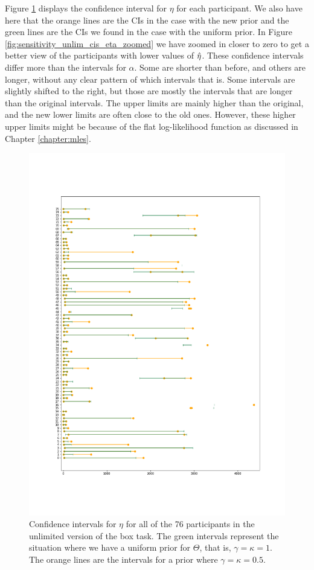 Figure \ref{fig:sensitivity_unlim_cis_eta} displays the confidence interval for $\eta$ for each participant. We also have here that the orange lines are the CIs in the case with the new prior and the green lines are the CIs we found in the case with the uniform prior. In Figure \ref{fig:sensitivity_unlim_cis_eta_zoomed} we have zoomed in closer to zero to get a better view of the participants with lower values of $\hat{\eta}$. These confidence intervals differ more than the intervals for $\alpha$. 
Some are shorter than before, and others are longer, without any clear pattern of which intervals that is. Some intervals are slightly shifted to the right, but those are mostly the intervals that are longer than the original intervals. The upper limits are mainly higher than the original, and the new lower limits are often close to the old ones. 
However, these higher upper limits might be because of the flat log-likelihood function as discussed in Chapter \ref{chapter:mles}.
\begin{figure}
    \centering
    \includegraphics[scale=0.36]{pictures/Sensitivity/ci_unlim_eta.png}
    \caption[CIs for $\eta$ for all participants with two different priors, unlimited]{
    Confidence intervals for $\eta$ for all of the 76 participants in the unlimited version of the box task. The green intervals represent the situation where we have a uniform prior for $\Theta$, that is, $\gamma=\kappa=1$. The orange lines are the intervals for a prior where $\gamma=\kappa=0.5$.}
    \label{fig:sensitivity_unlim_cis_eta}
\end{figure}
